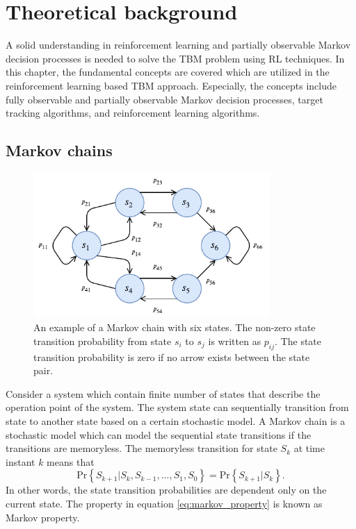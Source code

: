 \documentclass[english, 12pt, a4paper, elec, utf8, a-1b, online]{aaltothesis}
\renewcommand{\Pr}[1]{\text{Pr}\left\{ #1 \right\}}
\begin{document}
\newpage
\section{Theoretical background}

A solid understanding in reinforcement learning and partially observable Markov decision processes is needed to solve the TBM problem using RL techniques.
In this chapter, the fundamental concepts are covered which are utilized in the reinforcement learning based TBM approach.
Especially, the concepts include fully observable and partially observable Markov decision processes, target tracking algorithms, and reinforcement learning algorithms.


\subsection{Markov chains} \label{sec:MC}

\begin{figure}[b]
    \centering
    \includegraphics[width=0.8\textwidth]{figures/MarkovChain.pdf}
    \caption{
    An example of a Markov chain with six states. 
    The non-zero state transition probability from state $s_i$ to $s_j$ is written as $p_{ij}$.
    The state transition probability is zero if no arrow exists between the state pair. }
    \label{fig:mc}
\end{figure}


Consider a system which contain finite number of states that describe the operation point of the system.
The system state can sequentially transition from state to another state based on a certain stochastic model.
A Markov chain is a stochastic model which can model the sequential state transitions if the transitions are memoryless.
The memoryless transition for state $S_k$ at time instant $k$ means that   
\begin{equation} \label{eq:markov_property}
    \Pr{S_{k+1} | S_k, S_{k-1}, ..., S_1, S_0} = \Pr{S_{k+1} | S_k}.
\end{equation}
In other words, the state transition probabilities are dependent only on the current state.
The property in equation \eqref{eq:markov_property} is known as Markov property.
\end{document}

